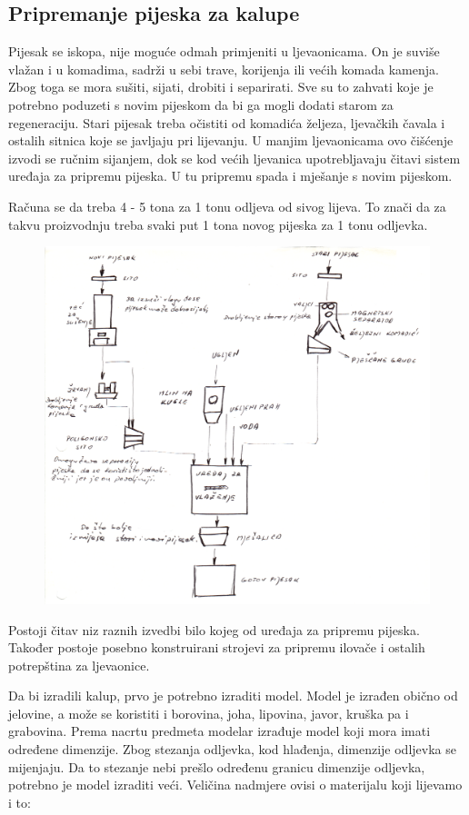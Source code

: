 \documentclass[a4paper,12pt]{article}
\numberwithin{figure}{section}
\begin{document}
\subsection{Pripremanje pijeska za kalupe}
Pijesak se iskopa, nije moguće odmah primjeniti u ljevaonicama. On je suviše vlažan i u komadima, sadrži u sebi trave, korijenja ili većih komada kamenja. Zbog toga se mora sušiti, sijati, drobiti i separirati. Sve su to zahvati koje je potrebno poduzeti s novim pijeskom da bi ga mogli dodati starom za regeneraciju. Stari pijesak treba očistiti od komadića željeza, ljevačkih čavala i ostalih sitnica koje se javljaju pri lijevanju. U manjim ljevaonicama ovo čišćenje izvodi se ručnim sijanjem, dok se kod većih ljevanica upotrebljavaju čitavi sistem uređaja za pripremu pijeska. U tu pripremu spada i mješanje s novim pijeskom.\par
Računa se da treba 4 - 5 tona za 1 tonu odljeva od sivog lijeva. To znači da za takvu proizvodnju treba svaki put 1 tona novog pijeska za 1 tonu odljevka.
\begin{figure}[!h]
\centering
\includegraphics[scale=0.17]{image_58.png}
\end{figure}
\FloatBarrier
Postoji čitav niz raznih izvedbi bilo kojeg od uređaja za pripremu pijeska. Također postoje posebno konstruirani strojevi za pripremu ilovače i ostalih potrepština za ljevaonice. \par
Da bi izradili kalup, prvo je potrebno izraditi model. Model je izrađen obično od jelovine, a može se koristiti i borovina, joha, lipovina, javor, kruška pa i grabovina. Prema nacrtu predmeta modelar izrađuje model koji mora imati određene dimenzije. Zbog stezanja odljevka, kod hlađenja, dimenzije odljevka se mijenjaju. Da to stezanje nebi prešlo određenu granicu dimenzije odljevka, potrebno je model izraditi veći. Veličina nadmjere ovisi o materijalu koji lijevamo i to:\\ 
\end{document}
